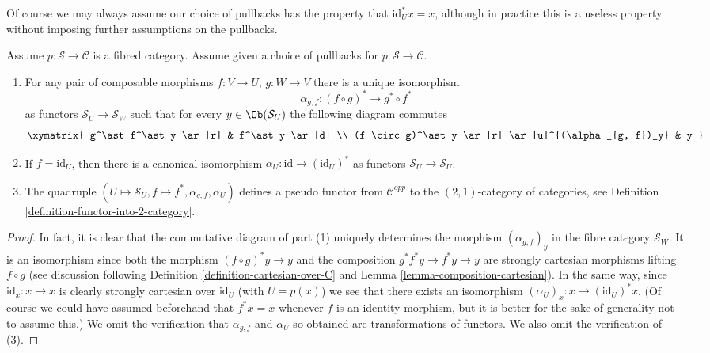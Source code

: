\noindent
Of course we may always assume our choice of pullbacks has the property that
$\text{id}_U^*x = x$, although in practice this is a useless property
without imposing further assumptions on the pullbacks.

\begin{lemma}
\label{lemma-fibred}
Assume $p : \mathcal{S} \to \mathcal{C}$ is a fibred category.
Assume given a choice of pullbacks for $p : \mathcal{S} \to \mathcal{C}$.
\begin{enumerate}
\item For any pair of composable morphisms $f : V \to U$,
$g : W \to V$ there is a unique isomorphism
$$
\alpha_{g, f} :
(f \circ g)^\ast
\longrightarrow
g^\ast \circ f^\ast
$$
as functors $\mathcal{S}_U \to \mathcal{S}_W$
such that for every $y\in \Ob(\mathcal{S}_U)$ the following
diagram commutes
$$
\xymatrix{
g^\ast f^\ast y \ar[r]
&
f^\ast y \ar[d] \\
(f \circ g)^\ast y \ar[r]
\ar[u]^{(\alpha_{g, f})_y}
&
y
}
$$
\item If $f = \text{id}_U$, then there is a canonical isomorphism
$\alpha_U : \text{id} \to (\text{id}_U)^*$ as functors
$\mathcal{S}_U \to \mathcal{S}_U$.
\item The quadruple
$(U \mapsto \mathcal{S}_U, f \mapsto f^*, \alpha_{g, f}, \alpha_U)$
defines a pseudo functor from $\mathcal{C}^{opp}$ to
the $(2, 1)$-category of categories, see
Definition \ref{definition-functor-into-2-category}.
\end{enumerate}
\end{lemma}

\begin{proof}
In fact, it is clear that the commutative diagram of
part (1) uniquely determines the morphism
$(\alpha_{g, f})_y$ in the fibre category
$\mathcal{S}_W$. It is an isomorphism since both
the morphism $(f \circ g)^*y \to y$
and the composition $g^*f^*y \to f^*y \to y$ are strongly
cartesian morphisms lifting $f \circ g$ (see discussion
following Definition \ref{definition-cartesian-over-C} and
Lemma \ref{lemma-composition-cartesian}). In the same way,
since $\text{id}_x : x \to x$ is clearly strongly cartesian
over $\text{id}_U$ (with $U = p(x)$) we see that there exists
an isomorphism $(\alpha_U)_x : x \to (\text{id}_U)^*x$.
(Of course we could have assumed beforehand that $f^*x = x$
whenever $f$ is an identity morphism, but it is better for
the sake of generality not to assume this.)
We omit the verification that $\alpha_{g, f}$ and
$\alpha_U$ so obtained are transformations of functors.
We also omit the verification of (3).
\end{proof}

